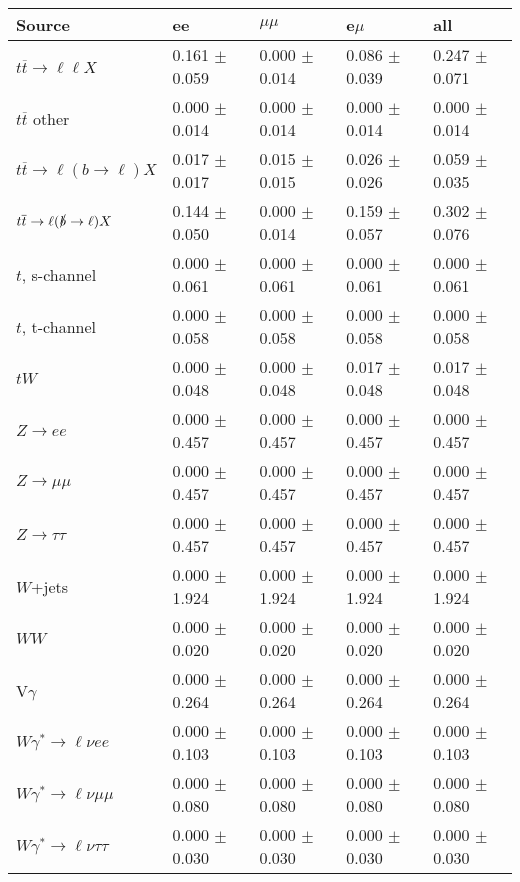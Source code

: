 \begin{tabular}{l | l l l l}
\hline\hline
 Source  &  ee  &  $\mu\mu$  &  e$\mu$  &  all \\
\hline
$t\overline{t}\rightarrow \ell\ell X$ &  0.161 $\pm$  0.059 &  0.000 $\pm$  0.014 &  0.086 $\pm$  0.039 &  0.247 $\pm$  0.071\\
$t\overline{t}$ other &  0.000 $\pm$  0.014 &  0.000 $\pm$  0.014 &  0.000 $\pm$  0.014 &  0.000 $\pm$  0.014\\
$t\overline{t}\rightarrow \ell(b\rightarrow \ell)X$ &  0.017 $\pm$  0.017 &  0.015 $\pm$  0.015 &  0.026 $\pm$  0.026 &  0.059 $\pm$  0.035\\
$t\overline{t}\rightarrow \ell(\slashed{b}\rightarrow \ell)X$ &  0.144 $\pm$  0.050 &  0.000 $\pm$  0.014 &  0.159 $\pm$  0.057 &  0.302 $\pm$  0.076\\
\hline
$t$, s-channel &  0.000 $\pm$  0.061 &  0.000 $\pm$  0.061 &  0.000 $\pm$  0.061 &  0.000 $\pm$  0.061\\
$t$, t-channel &  0.000 $\pm$  0.058 &  0.000 $\pm$  0.058 &  0.000 $\pm$  0.058 &  0.000 $\pm$  0.058\\
$tW$ &  0.000 $\pm$  0.048 &  0.000 $\pm$  0.048 &  0.017 $\pm$  0.048 &  0.017 $\pm$  0.048\\
\hline
$Z\rightarrow ee$ &  0.000 $\pm$  0.457 &  0.000 $\pm$  0.457 &  0.000 $\pm$  0.457 &  0.000 $\pm$  0.457\\
$Z\rightarrow\mu\mu$ &  0.000 $\pm$  0.457 &  0.000 $\pm$  0.457 &  0.000 $\pm$  0.457 &  0.000 $\pm$  0.457\\
$Z\rightarrow\tau\tau$ &  0.000 $\pm$  0.457 &  0.000 $\pm$  0.457 &  0.000 $\pm$  0.457 &  0.000 $\pm$  0.457\\
$W$+jets &  0.000 $\pm$  1.924 &  0.000 $\pm$  1.924 &  0.000 $\pm$  1.924 &  0.000 $\pm$  1.924\\
$WW$ &  0.000 $\pm$  0.020 &  0.000 $\pm$  0.020 &  0.000 $\pm$  0.020 &  0.000 $\pm$  0.020\\
\hline
V$\gamma$ &  0.000 $\pm$  0.264 &  0.000 $\pm$  0.264 &  0.000 $\pm$  0.264 &  0.000 $\pm$  0.264\\
$W\gamma^{*}\rightarrow\ell\nu e e$ &  0.000 $\pm$  0.103 &  0.000 $\pm$  0.103 &  0.000 $\pm$  0.103 &  0.000 $\pm$  0.103\\
$W\gamma^{*}\rightarrow\ell\nu\mu\mu$ &  0.000 $\pm$  0.080 &  0.000 $\pm$  0.080 &  0.000 $\pm$  0.080 &  0.000 $\pm$  0.080\\
$W\gamma^{*}\rightarrow\ell\nu\tau\tau$ &  0.000 $\pm$  0.030 &  0.000 $\pm$  0.030 &  0.000 $\pm$  0.030 &  0.000 $\pm$  0.030\\

\end{tabular}
